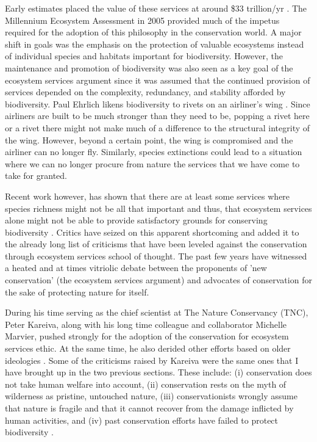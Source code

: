\documentclass[rutwik_proposal.tex]{subfiles}
\begin{document}
Early estimates placed the value of these services at around \$33 trillion/yr \cite{dArge97}. The Millennium Ecosystem Assessment in 2005 provided much of the impetus required for the adoption of this philosophy in the conservation world. A major shift in goals was the emphasis on the protection of valuable ecosystems instead of individual species and habitats important for biodiversity. However, the maintenance and promotion of biodiversity was also seen as a key goal of the ecosystem services argument since it was assumed that the continued provision of services depended on the complexity, redundancy, and stability afforded by biodiversity. Paul Ehrlich likens biodiversity to rivets on an airliner's wing \cite{Ehrlichs81}. Since airliners are built to be much stronger than they need to be, popping a rivet here or a rivet there might not make much of a difference to the structural integrity of the wing. However, beyond a certain point, the wing is compromised and the airliner can no longer fly. Similarly, species extinctions could lead to a situation where we can no longer procure from nature the services that we have come to take for granted.

Recent work however, has shown that there are at least some services where species richness might not be all that important and thus, that ecosystem services alone might not be able to provide satisfactory grounds for conserving biodiversity \cite{Winfree15, Ridder08}. Critics have seized on this apparent shortcoming and added it to the already long list of criticisms that have been leveled against the conservation through ecosystem services school of thought. The past few years have witnessed a heated and at times vitriolic debate between the proponents of 'new conservation' (the ecosystem services argument) and advocates of conservation for the sake of protecting nature for itself.

During his time serving as the chief scientist at The Nature Conservancy (TNC), Peter Kareiva, along with his long time colleague and collaborator Michelle Marvier, pushed strongly for the adoption of the conservation for ecosystem services ethic. At the same time, he also derided other efforts based on older ideologies \cite{Kareiva07, Kareiva12}. Some of the criticisms raised by Kareiva were the same ones that I have brought up in the two previous sections. These include: (i) conservation does not take human welfare into account, (ii) conservation rests on the myth of wilderness as pristine, untouched nature, (iii) conservationists wrongly assume that nature is fragile and that it cannot recover from the damage inflicted by human activities, and (iv) past conservation efforts have failed to protect biodiversity \cite{Kareiva07, Kareiva12, Doak14}. 
\end{document}
